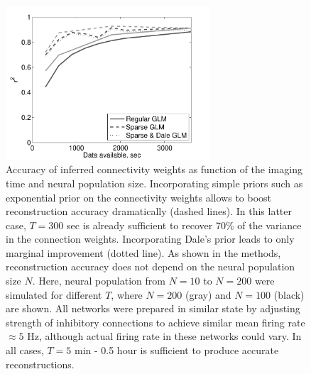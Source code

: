 \begin{figure}[h]
\centering
\includegraphics[width=3in]{../figs/FigureA7_recvar_NT}
\caption{Accuracy of inferred connectivity weights as function of the imaging time and neural population size.
Incorporating simple priors such as exponential prior on the connectivity weights allows to boost reconstruction accuracy dramatically (dashed lines). In this latter case, $T=300$ sec is already sufficient to recover 70\% of the variance in the connection weights. Incorporating Dale's prior leads to only marginal improvement (dotted line). As shown in the methods, reconstruction accuracy does not depend on the neural population size $N$.
Here, neural population from $N=10$ to $N=200$ were simulated for different $T$, where
$N=200$ (gray) and $N=100$ (black) are shown. All networks were prepared in similar state by adjusting strength of inhibitory connections to achieve similar mean firing rate $\approx 5$ Hz, although actual firing rate in these networks could vary.
In all cases, $T=5$ min - 0.5 hour is sufficient to produce accurate reconstructions.
}
\label{fig:recvar-NT}
\end{figure}


